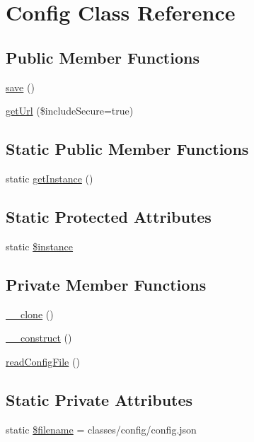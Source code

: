 \hypertarget{a00018}{}\section{Config Class Reference}
\label{a00018}
\subsection*{Public Member Functions}
\begin{DoxyCompactItemize}
\item 
\hyperlink{a00018_afc8a3c62679cf00ade9f15fb2a6d6132}{save} ()
\item 
\hyperlink{a00018_a12bdf521add546d8d6c3daf832a1ca64}{get\+Url} (\$include\+Secure=true)
\end{DoxyCompactItemize}
\subsection*{Static Public Member Functions}
\begin{DoxyCompactItemize}
\item 
static \hyperlink{a00018_ac93fbec81f07e5d15f80db907e63dc10}{get\+Instance} ()
\end{DoxyCompactItemize}
\subsection*{Static Protected Attributes}
\begin{DoxyCompactItemize}
\item 
static \hyperlink{a00018_ad9d7ce33ebb142b70e58b68052ca0ea8}{\$instance}
\end{DoxyCompactItemize}
\subsection*{Private Member Functions}
\begin{DoxyCompactItemize}
\item 
\hyperlink{a00018_ad0cb87b388bc74d63dc884accdca8713}{\+\_\+\+\_\+clone} ()
\item 
\hyperlink{a00018_a095c5d389db211932136b53f25f39685}{\+\_\+\+\_\+construct} ()
\item 
\hyperlink{a00018_a55c3dd2c0ad1c883a3fc76a679eabbe9}{read\+Config\+File} ()
\end{DoxyCompactItemize}
\subsection*{Static Private Attributes}
\begin{DoxyCompactItemize}
\item 
static \hyperlink{a00018_a0722441477f957078ee2437054556cbc}{\$filename} = \textquotesingle{}classes/config/config.\+json\textquotesingle{}
\end{DoxyCompactItemize}


